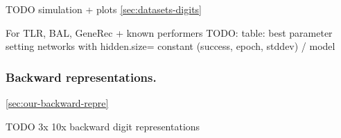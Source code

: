 TODO simulation + plots \ref{sec:datasets-digits} 

For TLR, BAL, GeneRec + known performers 
TODO: table: best parameter setting networks with hidden.size= constant (success, epoch, stddev) / model \\

\subsubsection{Backward representations.} 
\ref{sec:our-backward-repre} 

TODO 3x 10x backward digit representations 

